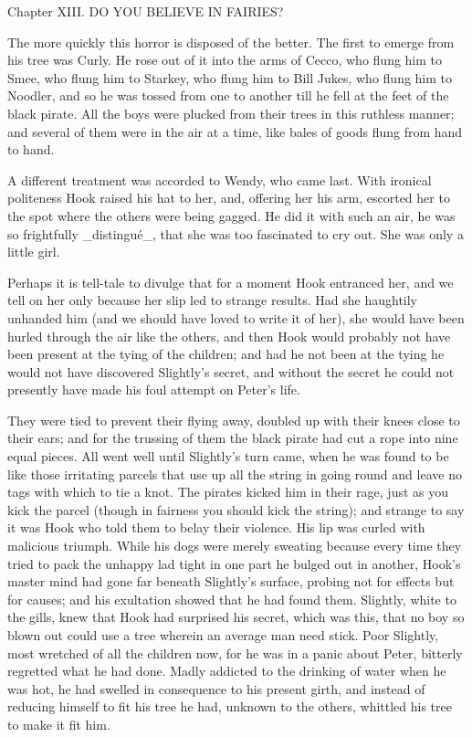 Chapter XIII.
DO YOU BELIEVE IN FAIRIES?


The more quickly this horror is disposed of the better. The first to
emerge from his tree was Curly. He rose out of it into the arms of
Cecco, who flung him to Smee, who flung him to Starkey, who flung him
to Bill Jukes, who flung him to Noodler, and so he was tossed from one
to another till he fell at the feet of the black pirate. All the boys
were plucked from their trees in this ruthless manner; and several of
them were in the air at a time, like bales of goods flung from hand to
hand.

A different treatment was accorded to Wendy, who came last. With
ironical politeness Hook raised his hat to her, and, offering her his
arm, escorted her to the spot where the others were being gagged. He
did it with such an air, he was so frightfully _distingué_, that she
was too fascinated to cry out. She was only a little girl.

Perhaps it is tell-tale to divulge that for a moment Hook entranced
her, and we tell on her only because her slip led to strange results.
Had she haughtily unhanded him (and we should have loved to write it of
her), she would have been hurled through the air like the others, and
then Hook would probably not have been present at the tying of the
children; and had he not been at the tying he would not have discovered
Slightly's secret, and without the secret he could not presently have
made his foul attempt on Peter's life.

They were tied to prevent their flying away, doubled up with their
knees close to their ears; and for the trussing of them the black
pirate had cut a rope into nine equal pieces. All went well until
Slightly's turn came, when he was found to be like those irritating
parcels that use up all the string in going round and leave no tags
with which to tie a knot. The pirates kicked him in their rage, just as
you kick the parcel (though in fairness you should kick the string);
and strange to say it was Hook who told them to belay their violence.
His lip was curled with malicious triumph. While his dogs were merely
sweating because every time they tried to pack the unhappy lad tight in
one part he bulged out in another, Hook's master mind had gone far
beneath Slightly's surface, probing not for effects but for causes; and
his exultation showed that he had found them. Slightly, white to the
gills, knew that Hook had surprised his secret, which was this, that no
boy so blown out could use a tree wherein an average man need stick.
Poor Slightly, most wretched of all the children now, for he was in a
panic about Peter, bitterly regretted what he had done. Madly addicted
to the drinking of water when he was hot, he had swelled in consequence
to his present girth, and instead of reducing himself to fit his tree
he had, unknown to the others, whittled his tree to make it fit him.

